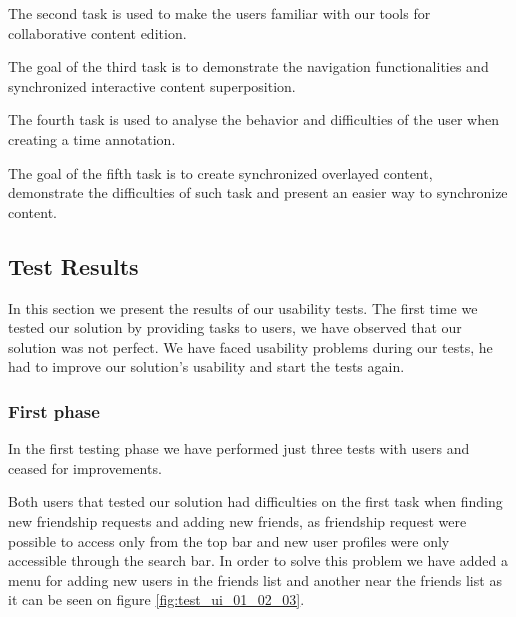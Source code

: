       The second task is used to make the users familiar with our tools for collaborative content edition.

      The goal of the third task is to demonstrate the navigation functionalities and synchronized interactive content superposition.

      The fourth task is used to analyse the behavior and difficulties of the user when creating a time annotation.

      The goal of the fifth task is to create synchronized overlayed content, demonstrate the difficulties of such task and present an easier way to synchronize content.

  \subsection{Test Results}

In this section we present the results of our usability tests. The first time we tested our solution by providing tasks to users, we have observed that our solution was not perfect. We have faced usability problems during our tests, he had to improve our solution's usability and start the tests again.

  \subsubsection {First phase}

In the first testing phase we have performed just three tests with users and ceased for improvements. 

Both users that tested our solution had difficulties on the first task when finding new friendship requests and adding new friends, as friendship request were possible to access only from the top bar and new user profiles were only accessible through the search bar. In order to solve this problem we have added a menu for adding new users in the friends list and another near the friends list as it can be seen on figure \ref{fig:test_ui_01_02_03}.

